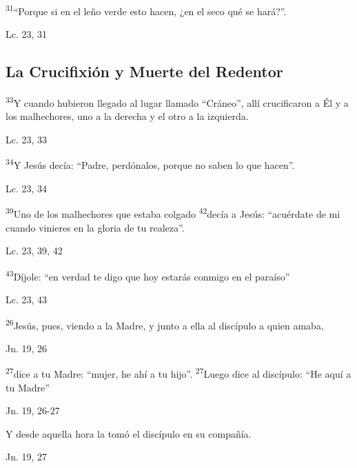 \documentclass[a4paper,11pt,sans]{article}
\begin{document}
      \textsuperscript{31}``Porque si en el leño verde esto hacen, ¿en el seco qué se hará?''.
      \begin{center}
        Lc. 23, 31
      \end{center}

    \subsection*{\hfil La Crucifixión y Muerte del Redentor \hfil}
      
      \textsuperscript{33}Y cuando hubieron llegado al lugar llamado ``Cráneo'', allí crucificaron a Él y a los malhechores, uno a la derecha y el otro a la izquierda.
      \begin{center}
        Lc. 23, 33
      \end{center}

      \textsuperscript{34}Y Jesús decía: ``Padre, perdónalos, porque no saben lo que hacen''.
      \begin{center}
        Lc. 23, 34
      \end{center}

      \textsuperscript{39}Uno de los malhechores que estaba colgado \textsuperscript{42}decía a Jesús: ``acuérdate de mi cuando vinieres en la gloria de tu realeza''.
      \begin{center}
        Lc. 23, 39, 42
      \end{center}

      \textsuperscript{43}Díjole: ``en verdad te digo que hoy estarás conmigo en el paraíso''
      \begin{center}
        Lc. 23, 43
      \end{center}

      \textsuperscript{26}Jesús, pues, viendo a la Madre, y junto a ella al discípulo a quien amaba,
      \begin{center}
        Jn. 19, 26
      \end{center}

      \textsuperscript{27}dice a tu Madre: ``mujer, he ahí a tu hijo''. \textsuperscript{27}Luego dice al discípulo: ``He aquí a tu Madre''
      \begin{center}
        Jn. 19, 26-27
      \end{center}

      Y desde aquella hora la tomó el discípulo en su compañía.
      \begin{center}
        Jn. 19, 27
      \end{center}
\end{document}
